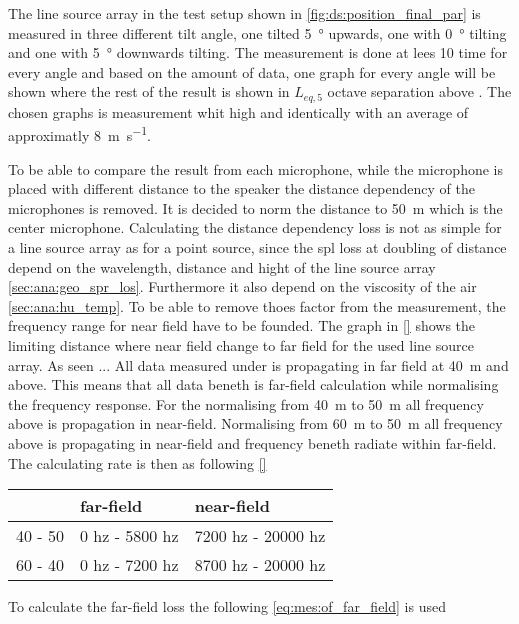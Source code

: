 The line source array in the test setup shown in \autoref{fig:ds:position_final_par} is measured in three different tilt angle, one tilted \SI{5}{\degree} upwards, one with \SI{0}{\degree} tilting and one with \SI{5}{\degree} downwards tilting. The measurement is done at lees 10 time for every angle and based on the amount of data, one graph for every angle will be shown where the rest of the result is shown in $L_{eq,5}$ octave separation above . The chosen graphs is measurement whit high and identically with an average of approximatly \SI{8}{\meter\per\second}.

To be able to compare the result from each microphone, while the microphone is placed with different distance to the speaker the distance dependency of the microphones is removed. It is decided to norm the distance to \SI{50}{\meter} which is the center microphone. Calculating the distance dependency loss is not as simple for a line source array as for a point source, since the \gls{spl} loss at doubling of distance depend on the wavelength, distance and hight of the line source array \autoref{sec:ana:geo_spr_los}. Furthermore it also depend on the viscosity of the air \autoref{sec:ana:hu_temp}. To be able to remove thoes factor from the measurement, the frequency range for near field have to be founded. The graph in \autoref{} shows the limiting distance where near field change to far field for the used line source array. As seen    ... All data measured under  is propagating in far field at \SI{40}{\meter} and above. This means that all data beneth  is far-field calculation while normalising the frequency response. For the normalising from \SI{40}{\meter} to \SI{50}{\meter} all frequency above  is propagation in near-field. Normalising from \SI{60}{\meter} to \SI{50}{\meter} all frequency above  is propagating in near-field and frequency beneth  radiate within far-field. The calculating rate is then as following \autoref{}

\begin{table}[H]
\begin{tabular}{l|ll}
        & far-field      & near-field         \\ \hline
40 - 50 & 0 hz - 5800 hz & 7200 hz - 20000 hz \\
60 - 40 & 0 hz - 7200 hz & 8700 hz - 20000 hz
\end{tabular}
\end{table}


To calculate the far-field loss the following \autoref{eq:mes:of_far_field} is used 

